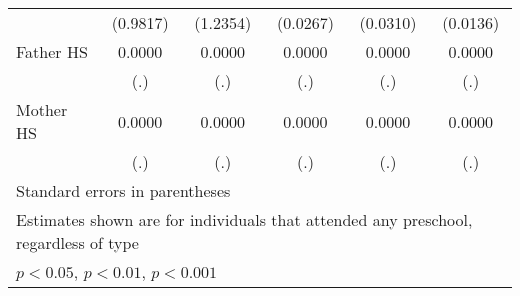 \begin{table}[htbp]
\begin{tabular}{l*{5}{c}}
            &    (0.9817)         &    (1.2354)         &    (0.0267)         &    (0.0310)         &    (0.0136)         \\
\addlinespace
Father HS   &      0.0000         &      0.0000         &      0.0000         &      0.0000         &      0.0000         \\
            &         (.)         &         (.)         &         (.)         &         (.)         &         (.)         \\
\addlinespace
Mother HS   &      0.0000         &      0.0000         &      0.0000         &      0.0000         &      0.0000         \\
            &         (.)         &         (.)         &         (.)         &         (.)         &         (.)         \\
\bottomrule
\multicolumn{6}{l}{\footnotesize Standard errors in parentheses}\\
\multicolumn{6}{l}{\footnotesize Estimates shown are for individuals that attended any preschool, regardless of type}\\
\multicolumn{6}{l}{\footnotesize \sym{*} \(p<0.05\), \sym{**} \(p<0.01\), \sym{***} \(p<0.001\)}\\
\end{tabular}
\end{table}
